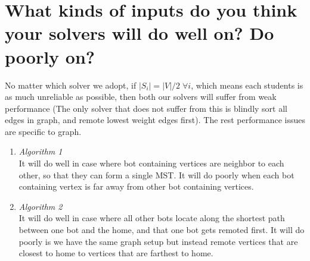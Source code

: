 \documentclass[10pt,a4paper]{article}
\begin{document}
\section{What kinds of inputs do you think your solvers will do well on? Do poorly on?}
No matter which solver we adopt, if $|S_i| = |V|/2 \; \forall i$, which means each students is as much unreliable as possible, then both our solvers will suffer from weak performance (The only solver that does not suffer from this is blindly sort all edges in graph, and remote lowest weight edges first).
The rest performance issues are specific to graph.
\begin{enumerate}[label=(\alph*)]
    \item \emph{Algorithm 1}\\
    It will do well in case where bot containing vertices are neighbor to each other, so that they can form a single MST. It will do poorly when each bot containing vertex is far away from other bot containing vertices. 
    \item \emph{Algorithm 2}\\
    It will do well in case where all other bots locate along the shortest path between one bot and the home, and that one bot gets remoted first. It will do poorly is we have the same graph setup but instead remote vertices that are closest to home to vertices that are farthest to home.
\end{enumerate}
\end{document}
